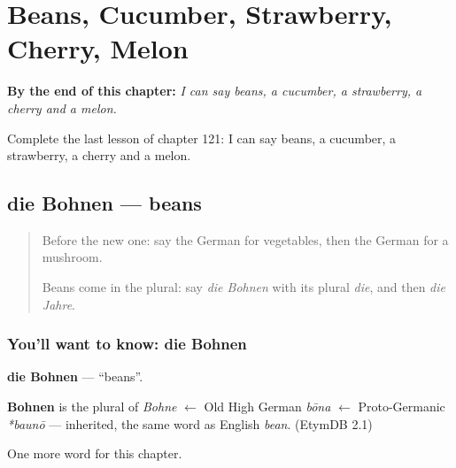 
\chapter{Beans, Cucumber, Strawberry, Cherry, Melon}
\label{ch:ge-beans-cucumber-strawberry-cherry-melon}

\begin{chapteropening}
\textbf{By the end of this chapter:} \emph{I can say beans, a cucumber, a strawberry, a cherry and a melon.}

Complete the last lesson of chapter 121: I can say beans, a cucumber, a strawberry, a cherry and a melon.
\end{chapteropening}

\section[die Bohnen]{die Bohnen — beans}

\label{lesson:GE-C121-bohnen}



\begin{quote}
Before the new one: say the German for vegetables, then the German for a mushroom.

Beans come in the plural: say \emph{die Bohnen} with its plural \emph{die}, and then \emph{die Jahre}.
\end{quote}

\subsection*{You'll want to know: die Bohnen}
\textbf{die Bohnen} — \textquotedblleft{}beans\textquotedblright{}.

\begin{cousinweb}
\textbf{Bohnen} is the plural of \emph{Bohne} $\leftarrow$ Old High German \emph{bōna} $\leftarrow$ Proto-Germanic \emph{*baunō} — inherited, the same word as English \emph{bean}. (EtymDB 2.1)
\end{cousinweb}

\begin{grammarlens}[title={What you've built}]
One more word for this chapter.
\end{grammarlens}

